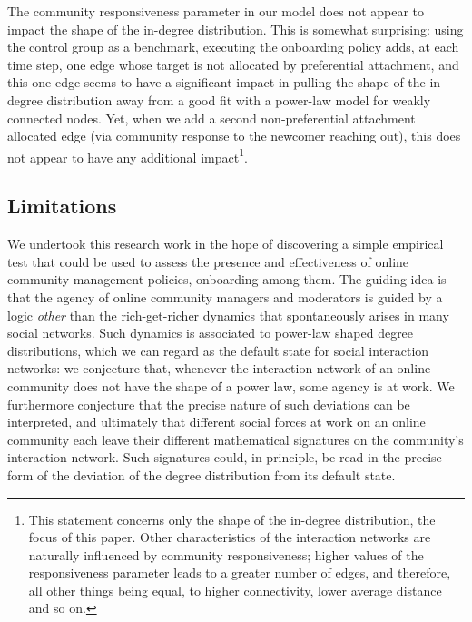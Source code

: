 \documentclass{bmcart}
\begin{document}
The community responsiveness parameter in our model does not appear to impact the shape of the in-degree distribution. This is somewhat surprising: using the control group as a benchmark, executing the onboarding policy adds, at each time step, one edge whose target is not allocated by preferential attachment, and this one edge seems to have a significant impact in pulling the shape of the in-degree distribution away from a good fit with a power-law model for weakly connected nodes. Yet, when we add a second non-preferential attachment allocated edge (via community response to the newcomer reaching out), this does not appear to have any additional impact\footnote{This statement concerns only the shape of the in-degree distribution, the focus of this paper. Other characteristics of the interaction networks are naturally influenced by community responsiveness; higher values of the responsiveness parameter leads to a greater number of edges, and therefore, all other things being equal, to higher connectivity, lower average distance and so on. }.

\subsection*{Limitations}

We undertook this research work in the hope of discovering a simple empirical test that could be used to assess the presence and effectiveness of online community management policies, onboarding among them. The guiding idea is that the agency of online community managers and moderators is guided by a logic \textit{other} than the rich-get-richer dynamics that spontaneously arises in many social networks. Such dynamics is associated to power-law shaped degree distributions, which we can regard as the default state for social interaction networks: we conjecture that, whenever the interaction network of an online community does not have the shape of a power law, some agency is at work. We furthermore conjecture that the precise nature of such deviations can be interpreted, and ultimately that different social forces at work on an online community each leave their different mathematical signatures on the community's interaction network. Such signatures could, in principle, be read in the precise form of the deviation of the degree distribution from its default state. 
\end{document}
